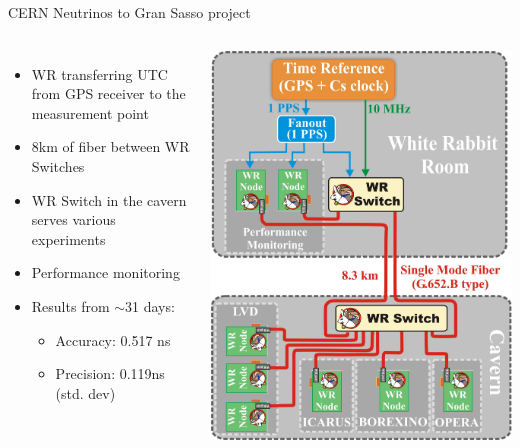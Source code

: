 \documentclass[compress,red]{beamer}
\begin{document}
\begin{frame}{CERN Neutrinos to Gran Sasso project}
   {
  \begin{columns}[c]
    \begin{itemize}
      \item WR transferring UTC from GPS receiver to the measurement point
      \item 8km of fiber between WR Switches
      \item WR Switch in the cavern serves various experiments
      \item Performance monitoring
      \item Results from $\sim$31 days:
        \begin{itemize}
          \item Accuracy: 0.517 ns
          \item Precision: 0.119ns (std. dev)
        \end{itemize}
    \end{itemize}
    \begin{center}
      \includegraphics[height=0.75\textheight]{applications/lngs_installation.pdf}
    \end{center}
  \end{columns}
  }

\end{frame}
\end{document}
